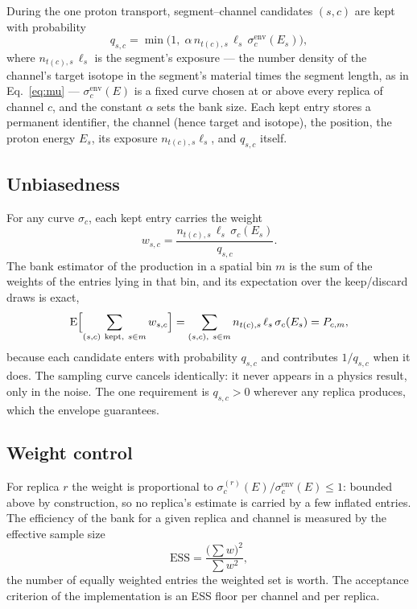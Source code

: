 \documentclass[11pt]{article}
\begin{document}
During the one proton transport, segment--channel candidates $(s,c)$ are
kept with probability
\begin{equation}
  q_{s,c} = \min\!\bigl(1,\;
  \alpha\, n_{t(c),s}\,\ell_s\,\sigma^{\mathrm{env}}_{c}(E_s)\bigr),
  \label{eq:bank-q}
\end{equation}
where $n_{t(c),s}\,\ell_s$ is the segment's exposure --- the number
density of the channel's target isotope in the segment's material times the
segment length, as in Eq.~\eqref{eq:mu} --- $\sigma^{\mathrm{env}}_{c}(E)$
is a fixed curve chosen at or above every replica of channel $c$, and the
constant $\alpha$ sets the bank size.  Each kept entry stores a permanent
identifier, the channel (hence target and isotope), the position, the
proton energy $E_s$, its exposure $n_{t(c),s}\ell_s$, and $q_{s,c}$
itself.

\subsection{Unbiasedness}

For any curve $\sigma_c$, each kept entry carries the weight
\begin{equation}
  w_{s,c} = \frac{n_{t(c),s}\,\ell_s\,\sigma_c(E_s)}{q_{s,c}}.
  \label{eq:bank-weight}
\end{equation}
The bank estimator of the production in a spatial bin $m$ is the sum of the
weights of the entries lying in that bin, and its expectation over the
keep/discard draws is exact,
\begin{equation}
  \mathrm{E}\Bigl[\sum_{(s,c)\ \mathrm{kept},\ s\in m} w_{s,c}\Bigr]
  = \sum_{(s,c),\ s\in m} n_{t(c),s}\,\ell_s\,\sigma_c(E_s)
  = P_{c,m},
  \label{eq:bank-unbiased}
\end{equation}
because each candidate enters with probability $q_{s,c}$ and contributes
$1/q_{s,c}$ when it does.  The sampling curve cancels identically: it never
appears in a physics result, only in the noise.  The one requirement is
$q_{s,c}>0$ wherever any replica produces, which the envelope guarantees.

\subsection{Weight control}

For replica $r$ the weight is proportional to
$\sigma^{(r)}_c(E)/\sigma^{\mathrm{env}}_c(E)\le 1$: bounded above by
construction, so no replica's estimate is carried by a few inflated
entries.  The efficiency of the bank for a given replica and channel is
measured by the effective sample size
\begin{equation}
  \mathrm{ESS} = \frac{\bigl(\sum w\bigr)^2}{\sum w^2},
  \label{eq:ess}
\end{equation}
the number of equally weighted entries the weighted set is worth.  The
acceptance criterion of the implementation is an ESS floor per channel and
per replica.
\end{document}

